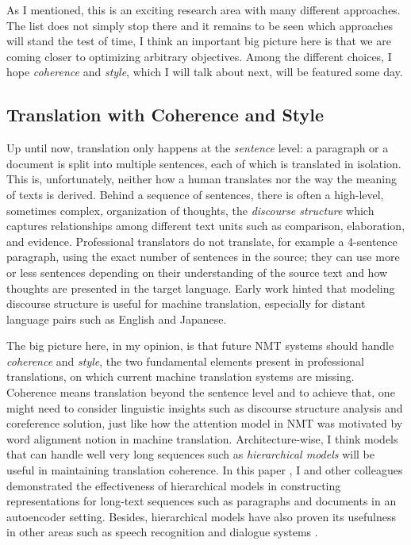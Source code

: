 As I mentioned, this is an exciting research area with many different approaches. The list does not simply stop there and it remains to be seen which approaches will stand the test of time, I think an important big picture here is that we are coming closer to optimizing arbitrary objectives. Among the different choices, I hope {\it coherence} and {\it style}, which I will talk about next, will be featured some day.

\subsection{Translation with Coherence and Style}
Up until now, translation only happens at the {\it sentence} level: a paragraph or a document is split into multiple sentences, each of which is translated in isolation. This is, unfortunately, neither how a human translates nor the way the meaning of texts is derived. Behind a sequence of sentences, there is often a high-level, sometimes complex, organization of thoughts, the {\it discourse structure} \cite{mann1988} which captures relationships among different text units such as comparison, elaboration, and evidence. Professional translators do not translate, for example a 4-sentence paragraph, using the exact number of sentences in the source; they can use more or less sentences depending on their understanding of the source text and how thoughts are presented in the target language. Early work \cite{marcu2000} hinted that modeling discourse structure is useful for machine translation, especially for distant language pairs such as English and Japanese.

The big picture here, in my opinion, is that future NMT systems should handle {\it coherence} and {\it style}, the two fundamental elements present in professional translations, on which current machine translation systems are missing. Coherence means translation beyond the sentence level and to achieve that, one might need to consider linguistic insights such as discourse structure analysis and coreference solution, just like how the attention model in NMT was motivated by word alignment notion in machine translation. 
Architecture-wise, I think models that can handle well very long sequences such as {\it hierarchical models} will be useful in maintaining translation coherence. In this paper , I and other colleagues demonstrated the effectiveness of hierarchical models in constructing representations for long-text sequences such as paragraphs and documents in an autoencoder setting.
Besides, hierarchical models have also proven its usefulness in other areas such as speech recognition \cite{chan16} and dialogue systems \cite{serban16}.


